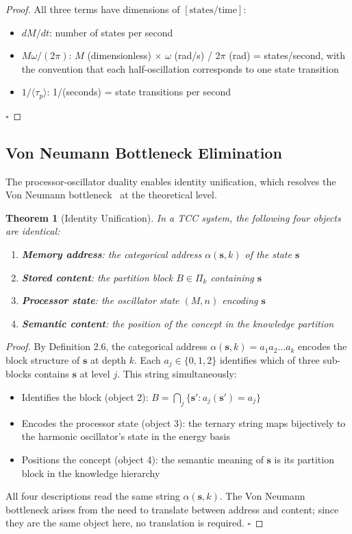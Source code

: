\documentclass[12pt,twocolumn]{article}
\newtheorem{theorem}{Theorem}[section]
\begin{document}
\begin{proof}
All three terms have dimensions of $[\text{states}/\text{time}]$:
\begin{itemize}
\item $dM/dt$: number of states per second
\item $M\omega/(2\pi)$: $M$ (dimensionless) $\times$ $\omega$ (rad/s) / $2\pi$ (rad) = states/second, with the convention that each half-oscillation corresponds to one state transition
\item $1/\langle\tau_p\rangle$: 1/(seconds) = state transitions per second
\end{itemize}
$\square$
\end{proof}

\subsection{Von Neumann Bottleneck Elimination}

The processor-oscillator duality enables identity unification, which resolves the Von Neumann bottleneck~\cite{hennessy2011computer} at the theoretical level.

\begin{theorem}[Identity Unification]
\label{thm:unification}
In a TCC system, the following four objects are identical:
\begin{enumerate}
\item \textbf{Memory address}: the categorical address $\alpha(\mathbf{s}, k)$ of the state $\mathbf{s}$
\item \textbf{Stored content}: the partition block $B \in \Pi_k$ containing $\mathbf{s}$
\item \textbf{Processor state}: the oscillator state $(M, n)$ encoding $\mathbf{s}$
\item \textbf{Semantic content}: the position of the concept in the knowledge partition
\end{enumerate}
\end{theorem}

\begin{proof}
By Definition 2.6, the categorical address $\alpha(\mathbf{s}, k) = a_1 a_2 \ldots a_k$ encodes the block structure of $\mathbf{s}$ at depth $k$. Each $a_j \in \{0,1,2\}$ identifies which of three sub-blocks contains $\mathbf{s}$ at level $j$. This string simultaneously:
\begin{itemize}
\item Identifies the block (object 2): $B = \bigcap_j \{\mathbf{s}' : a_j(\mathbf{s}') = a_j\}$
\item Encodes the processor state (object 3): the ternary string maps bijectively to the harmonic oscillator's state in the energy basis
\item Positions the concept (object 4): the semantic meaning of $\mathbf{s}$ is its partition block in the knowledge hierarchy
\end{itemize}
All four descriptions read the same string $\alpha(\mathbf{s}, k)$. The Von Neumann bottleneck arises from the need to translate between address and content; since they are the same object here, no translation is required. $\square$
\end{proof}
\end{document}
